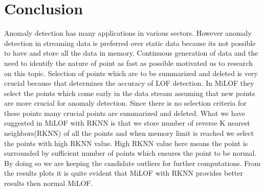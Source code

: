 \chapter{Conclusion}\label{Conclusion}

Anomaly detection has many applications in various sectors. However anomaly detection in
streaming data is preferred over static data because its not possible to have and store all the data
in memory. Continuous generation of data and the need to identify the nature of point as fast as
possible motivated us to research on this topic.
Selection of points which are to be summarized and deleted is very crucial because that determines
the accuracy of LOF detection. In MiLOF they select the points which come early in the data stream
assuming that new points are more crucial for anomaly detection. Since there is no selection criteria
for these points many crucial points are summarized and deleted. What we have suggested in MiLOF
with RKNN is that we store number of reverse K nearest neighbors(RKNN) of all the points and
when memory limit is reached we select the points with high RKNN value. High RKNN value here
means the point is surrounded by sufficient number of points which ensures the point to be normal.
By doing so we are keeping the candidate outliers for further computations. From the results plots
it is quite evident that MiLOF with RKNN provides better results then normal MiLOF.